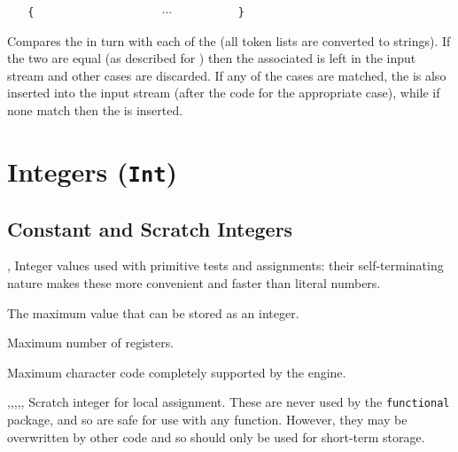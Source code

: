 \documentclass[oneside]{book}
\begin{document}
\begin{function}{\StrCaseTF}
\begin{syntax}
 
~ ~ \verb|{|
~ ~ ~ ~  
~ ~ ~ ~  
~ ~ ~ ~ $\cdots$
~ ~ ~ ~  
~ ~ \verb|}|
~ ~ 
~ ~ 
\end{syntax}
Compares the  in turn with each
of the  (all token lists are converted to strings).
If the two are equal (as described for
) then the associated  is left in the
input stream and other cases are discarded. If any of the
cases are matched, the  is also inserted into the
input stream (after the code for the appropriate case), while if none
match then the  is inserted.
\end{function}

\chapter{Integers (\texttt{Int})}

\section{Constant and Scratch Integers}

\begin{variable}{\cZeroInt,\cOneInt}
Integer values used with primitive tests and assignments: their
self-terminating nature makes these more convenient and faster than
literal numbers.
\end{variable}

\begin{variable}{\cMaxInt}
The maximum value that can be stored as an integer.
\end{variable}

\begin{variable}{\cMaxRegisterInt}
Maximum number of registers.
\end{variable}

\begin{variable}{\cMaxCharInt}
Maximum character code completely supported by the engine.
\end{variable}

\begin{variable}{\lTmpaInt,\lTmpbInt,\lTmpcInt,\lTmpiInt,\lTmpjInt,\lTmpkInt}
Scratch integer for local assignment. These are never used by
the \verb!functional! package, and so are safe for use with any
function. However, they may be overwritten by other
code and so should only be used for short-term storage.
\end{variable}
\end{document}
